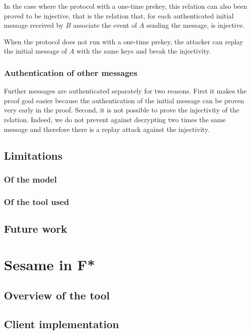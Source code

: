 \documentclass[a4paper, 10pt]{article}
\begin{document}
		In the case where the protocol with a one-time prekey, this relation can also been proved to be injective, that is the relation that, for each authenticated initial message received by $B$ associate the event of $A$ sending the message, is injective.
		
		When the protocol does not run with a one-time prekey, the attacker can replay the initial message of $A$ with the same keys and break the injectivity.
		
		\subsubsection{Authentication of other messages}
		Further messages are authenticated separately for two reasons. First it makes the proof goal easier because the authentication of the initial message can be proven very early in the proof. Second, it is not possible to prove the injectivity of the relation.
		Indeed, we do not prevent against decrypting two times the same message and therefore there is a replay attack against the injectivity.
		
	\subsection{Limitations}
		\subsubsection{Of the model}

		\subsubsection{Of the tool used}

	\subsection{Future work}

\section{Sesame in F*}
	\subsection{Overview of the tool}

	\subsection{Client implementation}
\end{document}
